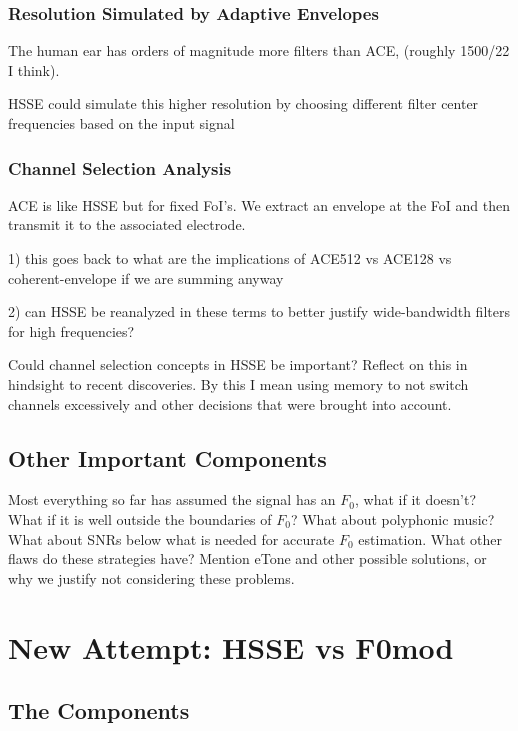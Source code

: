 \documentclass [11pt, proquest] {uwthesis}[2015/03/03]
\begin{document}
\subsection{Resolution Simulated by Adaptive Envelopes}

The human ear has orders of magnitude more filters than ACE, (roughly 1500/22 I think).

HSSE could simulate this higher resolution by choosing different filter center frequencies based on the input signal

\subsection{Channel Selection Analysis}

ACE is like HSSE but for fixed FoI's.  We extract an envelope at the FoI and then transmit it to the associated electrode.

1) this goes back to what are the implications of ACE512 vs ACE128 vs coherent-envelope if we are summing anyway

2) can HSSE be reanalyzed in these terms to better justify wide-bandwidth filters for high frequencies?

Could channel selection concepts in HSSE be important?  Reflect on this in hindsight to recent discoveries.  By this I mean using memory to not switch channels excessively and other decisions that were brought into account.

\section{Other Important Components}

Most everything so far has assumed the signal has an $F_0$, what if it doesn't?  What if it is well outside the boundaries of $F_0$?  What about polyphonic music?  What about SNRs below what is needed for accurate $F_0$ estimation.  What other flaws do these strategies have?  Mention eTone and other possible solutions, or why we justify not considering these problems.
 

\chapter{New Attempt: HSSE vs F0mod}

\section{The Components}
\end{document}
